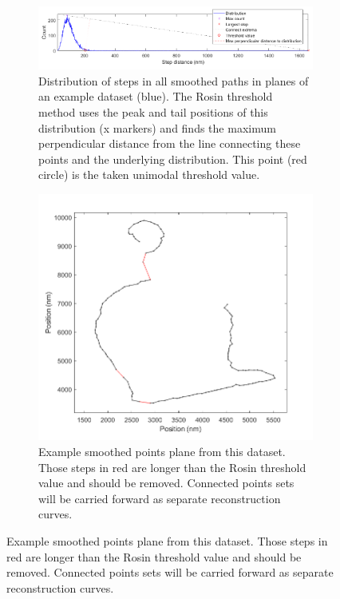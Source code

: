 \documentclass[10pt,a4paper]{article}
\begin{document}
\begin{figure}
	\centering
	\begin{subfigure}[b]{.95\textwidth}
		\centering
		\includegraphics[width=\textwidth]{./figures/rosinThresholdDistribution.png}
		\caption[Step1]{Distribution of steps in all smoothed paths in planes of an example dataset (blue). The Rosin threshold method uses the peak and tail positions of this distribution (x markers) and finds the maximum perpendicular distance from the line connecting these points and the underlying distribution. This point (red circle) is the taken unimodal threshold value.}
		\label{fig:rosinDistribution}
	\end{subfigure}
	\begin{subfigure}[b]{.55\textwidth}
		\centering
		\includegraphics[width=\textwidth]{./figures/rosinThresholdPoints.png}
		\caption[Step1]{Example smoothed points plane from this dataset. Those steps in red are longer than the Rosin threshold value and should be removed. Connected points sets will be carried forward as separate reconstruction curves.}
		\label{fig:rosinPoints}
	\end{subfigure}
\end{figure}
\end{document}
